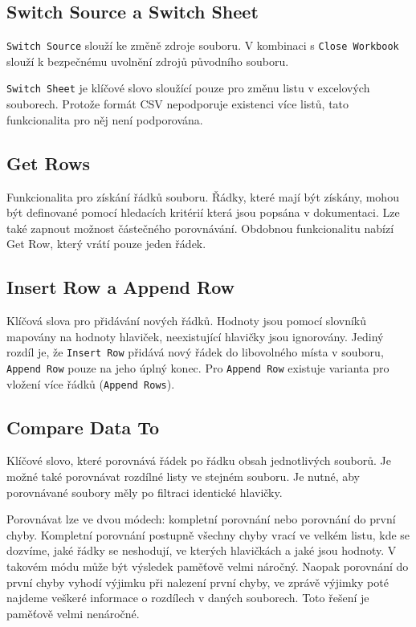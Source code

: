 \subsection{Switch Source a Switch Sheet}
\texttt{Switch Source} slouží ke změně zdroje souboru. V kombinaci s \texttt{Close Workbook} slouží k bezpečnému uvolnění zdrojů původního souboru.

\texttt{Switch Sheet} je klíčové slovo sloužící pouze pro změnu listu v excelových souborech. Protože formát CSV nepodporuje existenci více listů, tato funkcionalita pro něj není podporována.

\subsection{Get Rows}
Funkcionalita pro získání řádků souboru. Řádky, které mají být získány, mohou být definované pomocí hledacích kritérií která jsou popsána v dokumentaci. Lze také zapnout možnost částečného porovnávání. Obdobnou funkcionalitu nabízí Get Row, který vrátí pouze jeden řádek.

\subsection{Insert Row a Append Row}
Klíčová slova pro přidávání nových řádků. Hodnoty jsou pomocí slovníků mapovány na hodnoty hlaviček, neexistující hlavičky jsou ignorovány. Jediný rozdíl je, že \texttt{Insert Row} přidává nový řádek do libovolného místa v souboru, \texttt{Append Row} pouze na jeho úplný konec. Pro \texttt{Append Row} existuje varianta pro vložení více řádků (\texttt{Append Rows}).

\subsection{Compare Data To}
Klíčové slovo, které porovnává řádek po řádku obsah jednotlivých souborů. Je možné také porovnávat rozdílné listy ve stejném souboru. Je nutné, aby porovnávané soubory měly po filtraci identické hlavičky.

Porovnávat lze ve dvou módech: kompletní porovnání nebo porovnání do první chyby. Kompletní porovnání postupně všechny chyby vrací ve velkém listu, kde se dozvíme, jaké řádky se neshodují, ve kterých hlavičkách a jaké jsou hodnoty. V takovém módu může být výsledek paměťově velmi náročný. Naopak porovnání do první chyby vyhodí výjimku při nalezení první chyby, ve zprávě výjimky poté najdeme veškeré informace o rozdílech v daných souborech. Toto řešení je paměťově velmi nenáročné.

